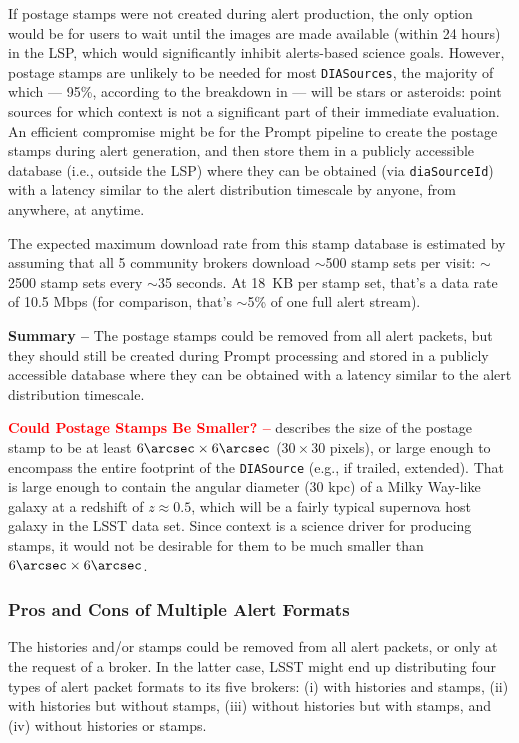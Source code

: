 \documentclass[DM,lsstdraft,authoryear,toc]{lsstdoc}
\begin{document}
If postage stamps were not created during alert production, the only option would be for users to wait until the images are made available (within 24 hours) in the LSP, which would significantly inhibit alerts-based science goals.
However, postage stamps are unlikely to be needed for most {\tt DIASources}, the majority of which --- 95\%, according to the breakdown in  --- will be stars or asteroids: point sources for which context is not a significant part of their immediate evaluation.
An efficient compromise might be for the Prompt pipeline to create the postage stamps during alert generation, and then store them in a publicly accessible database (i.e., outside the LSP) where they can be obtained (via {\tt diaSourceId}) with a latency similar to the alert distribution timescale by anyone, from anywhere, at anytime. 

The expected maximum download rate from this stamp database is estimated by assuming that all 5 community brokers download $\sim$500 stamp sets per visit: $\sim$2500 stamp sets every $\sim$35 seconds.
At 18~KB per stamp set, that's a data rate of 10.5 Mbps (for comparison, that's $\sim$5\% of one full alert stream).

{\bf Summary --} The postage stamps could be removed from all alert packets, but they should still be created during Prompt processing and stored in a publicly accessible database where they can be obtained with a latency similar to the alert distribution timescale.

\textcolor{red}{{\bf Could Postage Stamps Be Smaller? --}}
 describes the size of the postage stamp to be at least $6\arcsec \times 6\arcsec$ ($30\times30$ pixels), or large enough to encompass the entire footprint of the {\tt DIASource} (e.g., if trailed, extended). 
That is large enough to contain the angular diameter (30 kpc) of a Milky Way-like galaxy at a redshift of $z\approx0.5$, which will be a fairly typical supernova host galaxy in the LSST data set.
Since context is a science driver for producing stamps, it would not be desirable for them to be much smaller than $6\arcsec \times 6\arcsec$.


\subsubsection{Pros and Cons of Multiple Alert Formats}\label{sssec:packets_remove_procon}

The histories and/or stamps could be removed from all alert packets, or only at the request of a broker.
In the latter case, LSST might end up distributing four types of alert packet formats to its five brokers: (i) with histories and stamps, (ii) with histories but without stamps, (iii) without histories but with stamps, and (iv) without histories or stamps. 
\end{document}

